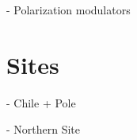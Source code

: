      - Polarization modulators

\section{Sites}

     - Chile + Pole

     - Northern Site
     
     
%



